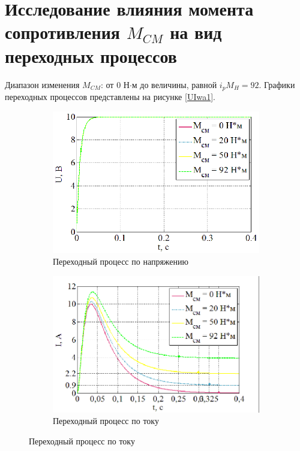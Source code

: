 \documentclass[a4paper,12pt]{article} %
\begin{document}
\section{Исследование влияния момента сопротивления $M_{CM}$ на вид переходных процессов}
Диапазон изменения $M_{CM}$: от 0 Н$\cdot$м до величины, равной $i_pM_H=92$. Графики переходных процессов представлены на рисунке \ref{UIwa1}.
\begin{figure}[H]
	\centering
	\begin{subfigure}[b]{0.48\textwidth}
	    \includegraphics[width = \textwidth]{scheme/U1}
		\caption{Переходный процесс по напряжению}
	\end{subfigure}
	\hfill
	\begin{subfigure}[b]{0.48\textwidth}
		\includegraphics[width = \textwidth]{scheme/I1}
		\caption{Переходный процесс по току}
	\end{subfigure}

\end{figure}
\end{document}
